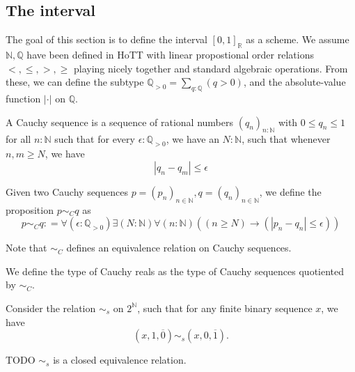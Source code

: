 \newpage
\subsection{The interval}
The goal of this section is to define the interval $[0,1]_\mathbb R$ as a scheme. 
We assume $\mathbb N, \mathbb Q$ have been defined in HoTT
with linear propostional order relations $<,\leq, > ,\geq$ playing nicely together 
and standard algebraic operations. 
From these, we can define the subtype $\mathbb Q_{>0}=\sum_{q : \mathbb Q} (q>0)$, 
and the absolute-value function $|\cdot|$ on $\mathbb Q$. 

\begin{definition}
  A Cauchy sequence is a sequence of rational numbers $(q_n)_{n: \mathbb N}$ with $0 \leq q_n \leq 1$ 
  for all $n:\mathbb N$
  such that for every $\epsilon: \mathbb Q_{>0}$, we have an $N:\mathbb N$, 
  such that whenever $n,m \geq N$, we have 
\begin{equation}
  | q_n - q_m | \leq \epsilon
\end{equation} 
\end{definition}

\begin{definition}
Given two Cauchy sequences $p = (p_n)_{n\in\mathbb N}, q=(q_n)_{n\in\mathbb N}$, 
we define the proposition $p \sim_C  q$ as 
\begin{equation}
  p \sim_C q : = \forall (\epsilon : \mathbb Q_{>0} )\exists ( N :\mathbb N) \forall (n : \mathbb N) ((n \geq N) \to 
  (| p_n - q_n| \leq  \epsilon))
\end{equation}
\end{definition}
Note that $\sim_C$ defines an equivalence relation on Cauchy sequences. 
\begin{definition}
We define the type of Cauchy reals as the type of Cauchy sequences quotiented by $\sim_C$. 
\end{definition}

%
%
Consider the relation $\sim_s$ on $2^{\mathbb N}$, 
such that for any finite binary sequence $x$, we have 
$$(x,1,\overline 0) \sim_s (x ,0, \overline 1).$$
\begin{lemma}
TODO  $\sim_s$ is a closed equivalence relation. 
\end{lemma}



